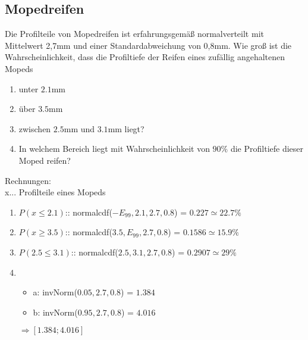 \subsection{Mopedreifen}

\hfill \break
Die Profilteile von Mopedreifen ist erfahrungsgemäß normalverteilt mit Mittelwert 2,7mm und
einer Standardabweichung von 0,8mm. Wie groß ist die Wahrscheinlichkeit, dass die Profiltiefe der
Reifen eines zufällig angehaltenen Mopeds
\begin{enumerate}
    \item unter $2.1$mm
    \item über $3.5$mm
    \item zwischen $2.5$mm und $3.1$mm liegt?
    \item In welchem Bereich liegt mit Wahrscheinlichkeit von $90\%$ die Profiltiefe dieser Moped reifen?
\end{enumerate}

\hfill \break
Rechnungen:\\
x... Profilteile eines Mopeds\\
\begin{enumerate}
    \item $P(x \leq 2.1)$:: normalcdf($-E_{99},2.1,2.7,0.8$) = $0.227 \simeq 22.7\%$
    \item $P(x \geq 3.5)$:: normalcdf($3.5,E_{99},2.7,0.8$) = $0.1586 \simeq 15.9\%$
    \item $P(2.5 \leq 3.1)$:: normalcdf($2.5,3.1,2.7,0.8$) = $0.2907 \simeq 29\%$
    \item \begin{itemize}
              \item a: invNorm($0.05,2.7,0.8$) = $1.384$
              \item b: invNorm($0.95,2.7,0.8$) = $4.016$
          \end{itemize} $\Rightarrow  [1.384;4.016]$
\end{enumerate}